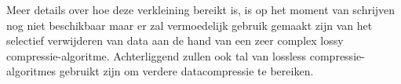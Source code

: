 Meer details over hoe deze verkleining bereikt is, is op het moment van schrijven nog niet beschikbaar maar er zal vermoedelijk gebruik gemaakt zijn van het selectief verwijderen van data aan de hand van een zeer complex \gls{lossy} \gls{compressie-algoritme}. Achterliggend zullen ook tal van \gls{lossless} \glspl{compressie-algoritme} gebruikt zijn om verdere \gls{datacompressie} te bereiken.
